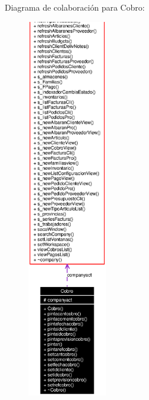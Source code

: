 Diagrama de colaboraci\'{o}n para Cobro:\begin{figure}[H]
\begin{center}
\leavevmode
\includegraphics[width=99pt]{classCobro__coll__graph}
\end{center}
\end{figure}
